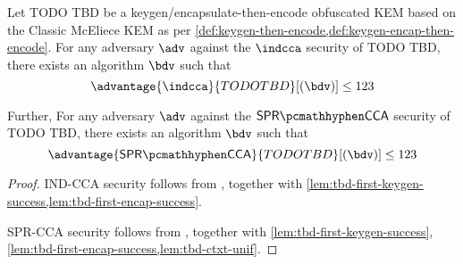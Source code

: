 \begin{theorem}
    Let TODO TBD be a keygen/encapsulate-then-encode obfuscated KEM based on the Classic McEliece KEM as per \cref{def:keygen-then-encode,def:keygen-encap-then-encode}. For any adversary $\adv$ against the $\indcca$ security of TODO TBD, there exists an algorithm $\bdv$ such that
    \[ \advantage{\indcca}{TODO TBD}[(\bdv)] \leq 123 \]

    Further,  For any adversary $\adv$ against the $\sprcca$ security of TODO TBD, there exists an algorithm $\bdv$ such that
    \[ \advantage{\sprcca}{TODO TBD}[(\bdv)] \leq 123 \]
\end{theorem}
\begin{proof}
    IND-CCA security follows from \cite[Theorem~2.12]{CCS:GunSteVei24}, together with \cref{lem:tbd-first-keygen-success,lem:tbd-first-encap-success}.
    
    SPR-CCA security follows from \cite[Theorem~2.13]{CCS:GunSteVei24}, together with \cref{lem:tbd-first-keygen-success}, \ref{lem:tbd-first-encap-success,lem:tbd-ctxt-unif}.
\end{proof}